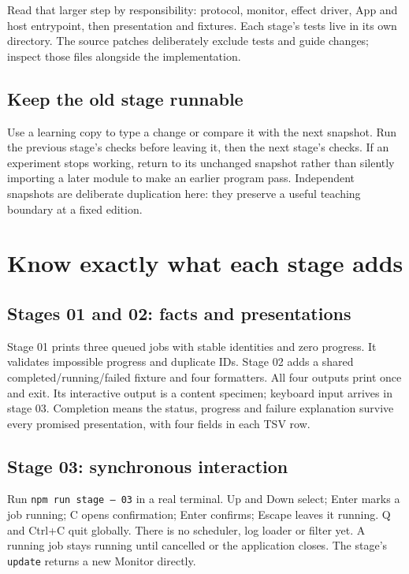 Read that larger step by responsibility: protocol, monitor, effect driver, App and host entrypoint, then presentation and fixtures. Each stage's tests live in its own  directory. The source patches deliberately exclude tests and guide changes; inspect those files alongside the implementation.

\subsection{Keep the old stage runnable}

Use a learning copy to type a change or compare it with the next snapshot. Run the previous stage's checks before leaving it, then the next stage's checks. If an experiment stops working, return to its unchanged snapshot rather than silently importing a later module to make an earlier program pass. Independent snapshots are deliberate duplication here: they preserve a useful teaching boundary at a fixed edition.

\section{Know exactly what each stage adds}
\subsection{Stages 01 and 02: facts and presentations}

Stage 01 prints three queued jobs with stable identities and zero progress. It validates impossible progress and duplicate IDs. Stage 02 adds a shared completed/running/failed fixture and four formatters. All four outputs print once and exit. Its interactive output is a content specimen; keyboard input arrives in stage 03. Completion means the status, progress and failure explanation survive every promised presentation, with four fields in each TSV row.

\subsection{Stage 03: synchronous interaction}

Run \texttt{npm run stage -- 03} in a real terminal. Up and Down select; Enter marks a job running; C opens confirmation; Enter confirms; Escape leaves it running. Q and Ctrl+C quit globally. There is no scheduler, log loader or filter yet. A running job stays running until cancelled or the application closes. The stage's \texttt{update} returns a new Monitor directly.

